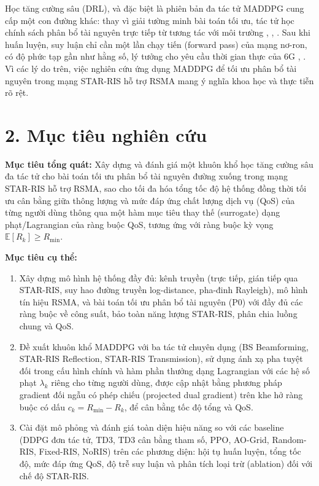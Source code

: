 Học tăng cường sâu (DRL), và đặc biệt là phiên bản đa tác tử MADDPG
cung cấp một con đường khác: thay vì giải tường minh bài toán tối ưu, tác tử
học chính sách phân bổ tài nguyên trực tiếp từ tương tác với môi trường
\cite{sutton2018reinforcement}, \cite{lillicrap2016continuous}, \cite{lowe2017multi}.
Sau khi huấn luyện, suy luận chỉ cần một lần chạy tiến (forward pass) của
mạng nơ-ron, có độ phức tạp gần như hằng số, lý tưởng cho yêu cầu thời
gian thực của 6G \cite{noman2026drl6g}, \cite{hieu2021optimal}. Vì các lý do trên,
việc nghiên cứu ứng dụng MADDPG để tối ưu phân bổ tài nguyên trong
mạng STAR-RIS hỗ trợ RSMA mang ý nghĩa khoa học và thực tiễn rõ rệt.

\section*{2. Mục tiêu nghiên cứu}

\noindent\textbf{Mục tiêu tổng quát:} Xây dựng và đánh giá một khuôn khổ
học tăng cường sâu đa tác tử cho bài toán tối ưu phân bổ tài nguyên đường
xuống trong mạng STAR-RIS hỗ trợ RSMA, sao cho tối đa hóa tổng tốc độ hệ
thống đồng thời tối ưu cân bằng giữa thông lượng và mức đáp ứng chất lượng
dịch vụ (QoS) của từng người dùng thông qua một hàm mục tiêu thay thế
(surrogate) dạng phạt/Lagrangian của ràng buộc QoS, tương ứng với ràng buộc
kỳ vọng $\mathbb{E}[R_k] \geq R_{\min}$.

\noindent\textbf{Mục tiêu cụ thể:}
\begin{enumerate}[label=(\arabic*),leftmargin=*]
\item Xây dựng mô hình hệ thống đầy đủ: kênh truyền (trực tiếp, gián tiếp
qua STAR-RIS, suy hao đường truyền log-distance, pha-đinh Rayleigh),
mô hình tín hiệu RSMA, và bài toán tối ưu phân bổ tài nguyên (P0) với
đầy đủ các ràng buộc về công suất, bảo toàn năng lượng STAR-RIS, phân
chia luồng chung và QoS.
\item Đề xuất khuôn khổ MADDPG với ba tác tử chuyên dụng (BS Beamforming,
STAR-RIS Reflection, STAR-RIS Transmission), sử dụng ánh xạ pha tuyệt đối
trong cấu hình chính và hàm phần thưởng dạng Lagrangian với các hệ số phạt
$\lambda_k$ riêng cho từng người dùng,
được cập nhật bằng phương pháp gradient đối ngẫu có phép chiếu
(projected dual gradient) trên khe hở ràng buộc có dấu
$c_k = R_{\min} - R_k$, để cân bằng tốc độ tổng và QoS.
\item Cài đặt mô phỏng và đánh giá toàn diện hiệu năng so với các baseline
(DDPG đơn tác tử, TD3, TD3 cân bằng tham số, PPO, AO-Grid, Random-RIS,
Fixed-RIS, NoRIS) trên các phương diện: hội tụ huấn luyện, tổng tốc độ,
mức đáp ứng QoS, độ trễ suy luận và phân tích loại trừ (ablation) đối
với chế độ STAR-RIS.
\end{enumerate}


